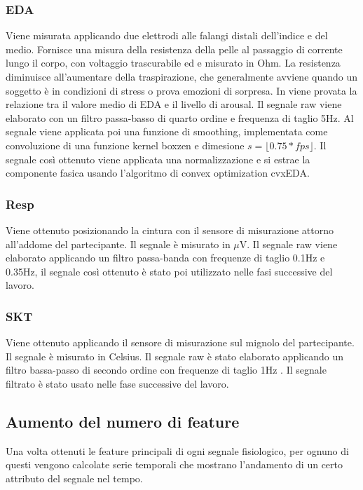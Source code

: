 \subsubsection{EDA}
Viene misurata applicando due elettrodi alle falangi distali dell'indice e del medio. Fornisce una misura della resistenza della pelle al passaggio di corrente lungo il corpo, con voltaggio trascurabile ed e misurato in Ohm. La resistenza diminuisce all'aumentare della traspirazione, che generalmente avviene quando un soggetto è in condizioni di stress o prova emozioni di sorpresa. In \cite{lang1993looking} viene provata la relazione tra il valore medio di EDA e il livello di arousal.
Il segnale raw viene elaborato con un filtro passa-basso di quarto ordine e frequenza di taglio 5Hz. Al segnale viene applicata poi una funzione di smoothing, implementata come convoluzione di una funzione kernel boxzen e dimesione $s = \lfloor0.75 * fps\rfloor$.
Il segnale così ottenuto viene applicata una normalizzazione e si estrae la componente fasica usando l'algoritmo di convex optimization cvxEDA\cite{greco2015cvxeda}.

\subsubsection{Resp}
Viene ottenuto posizionando la cintura con il sensore di misurazione attorno all'addome del partecipante. Il segnale è misurato in $\mu$V. Il segnale raw viene elaborato applicando un filtro passa-banda con frequenze di taglio 0.1Hz e 0.35Hz, il segnale così ottenuto è stato poi utilizzato nelle fasi successive del lavoro.

\subsubsection{SKT}
Viene ottenuto applicando il sensore di misurazione sul mignolo del partecipante. Il segnale è misurato in Celsius. Il segnale raw è stato elaborato applicando un filtro bassa-passo di secondo ordine con frequenze di taglio 1Hz \cite{palanisamy2013multiple}. Il segnale filtrato è stato usato nelle fase successive del lavoro.

\subsection{Aumento del numero di feature}
Una volta ottenuti le feature principali di ogni segnale fisiologico, per ognuno di questi vengono calcolate serie temporali che mostrano l'andamento di un certo attributo del segnale nel tempo.

